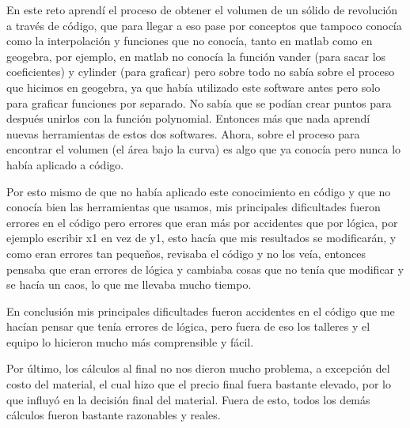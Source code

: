 
\tab En este reto aprendí el proceso de obtener el volumen de un sólido de revolución a través de código, que para llegar a eso pase por conceptos que tampoco conocía como la interpolación y funciones que no conocía, tanto en matlab como en geogebra, por ejemplo, en matlab no conocía la función vander (para sacar los coeficientes) y cylinder (para graficar) pero sobre todo no sabía sobre el proceso que hicimos en geogebra, ya que había utilizado este software antes pero solo para graficar funciones por separado. No sabía que se podían crear puntos para después unirlos con la función polynomial. Entonces más que nada aprendí nuevas herramientas de estos dos softwares. Ahora, sobre el proceso para encontrar el volumen (el área bajo la curva) es algo que ya conocía pero nunca lo había aplicado a código.

\tab Por esto mismo de que no había aplicado este conocimiento en código y que no conocía bien las herramientas que usamos, mis principales dificultades fueron errores en el código pero errores que eran más por accidentes que por lógica, por ejemplo escribir x1 en vez de y1, esto hacía que mis resultados se modificarán, y como eran errores tan pequeños, revisaba el código y no los veía, entonces pensaba que eran errores de lógica y cambiaba cosas que no tenía que modificar y se hacía un caos, lo que me llevaba mucho tiempo.

\tab En conclusión mis principales dificultades fueron accidentes en el código que me hacían pensar que tenía errores de lógica, pero fuera de eso los talleres y el equipo lo hicieron mucho más comprensible y fácil.

\tab Por último, los cálculos al final no nos dieron mucho problema, a excepción del costo del material, el cual hizo que el precio final fuera bastante elevado, por lo que influyó en la decisión final del material. Fuera de esto, todos los demás cálculos fueron bastante razonables y reales. 
